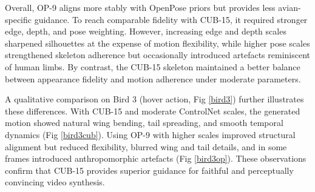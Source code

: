 \documentclass[final-report]{report-template}
\begin{document}
Overall, OP-9 aligns more stably with OpenPose priors but provides less avian-specific guidance. 
To reach comparable fidelity with CUB-15, it required stronger edge, depth, and pose weighting. 
However, increasing edge and depth scales sharpened silhouettes at the expense of motion flexibility, while higher pose scales strengthened skeleton adherence but occasionally introduced artefacts reminiscent of human limbs. 
By contrast, the CUB-15 skeleton maintained a better balance between appearance fidelity and motion adherence under moderate parameters.  

A qualitative comparison on Bird 3 (hover action, Fig \ref{bird3}) further illustrates these differences. 
With CUB-15 and moderate ControlNet scales, the generated motion showed natural wing bending, tail spreading, and smooth temporal dynamics (Fig \ref{bird3cub}). 
Using OP-9 with higher scales improved structural alignment but reduced flexibility, blurred wing and tail details, and in some frames introduced anthropomorphic artefacts (Fig \ref{bird3op}). 
These observations confirm that CUB-15 provides superior guidance for faithful and perceptually convincing video synthesis.
\end{document}
